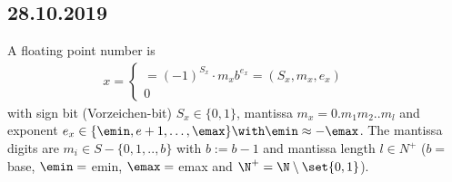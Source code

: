 \subsection*{28.10.2019}
A floating point number is 
\begin{align*}
	x = \begin{cases}
	= (-1)^{S_x}\cdot m_xb^{e_x}=(S_x,m_x,e_x) &\quad \\
	0 \quad
	\end{cases}
\end{align*}
with sign bit (Vorzeichen-bit) $S_x\in \{0,1\}$, mantissa $m_x=0.m_1m_2..m_l$ and exponent $e_x\in \{\emin,e+1,\dots,\emax\} \with \emin \approx -\emax$. The mantissa digits are $m_i\in S-\{0,1,..,b\}$ with $b:=b-1$ and mantissa length $l\in N^+$ ($b =$ base, $\emin =$ emin, $\emax =$ emax and $\N^+ = \N\setminus \set{0,1}$).
